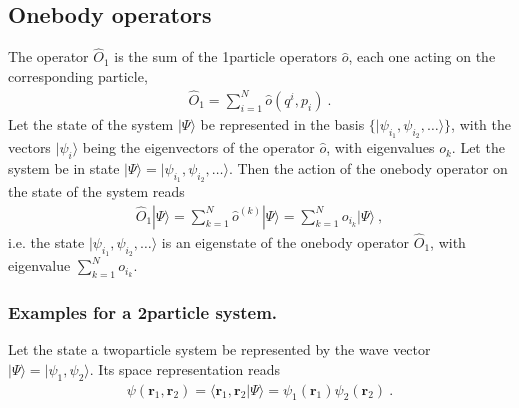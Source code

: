 \documentclass[letterpaper,10pt,english]{jupyterBook}
\begin{document}
\subsection{One\sphinxhyphen{}body operators}
\label{\detokenize{ch/quantum-mechanics/many-body/operators:one-body-operators}}\label{\detokenize{ch/quantum-mechanics/many-body/operators:quantum-mechanics-second-quantizazion-operators-one-body}}
\sphinxAtStartPar
{} The operator \(\hat{O}_1\) is the sum of the 1\sphinxhyphen{}particle operators \(\hat{o}\), each one acting on the corresponding particle,
\begin{equation}\label{equation:ch/quantum-mechanics/many-body/operators:eq:qft:operator:one-body:first-quantization}
\begin{split}\hat{O}_1 = \sum_{i=1}^{N} \hat{o}(q^i, p_i) \ .\end{split}
\end{equation}
\sphinxAtStartPar
Let the state of the system \(| \Psi \rangle\) be represented in the basis \(\{ | \psi_{i_1}, \psi_{i_2}, \dots \rangle \}\), with the vectors \(|\psi_i \rangle\) being the eigenvectors of the operator \(\hat{o}\), with eigenvalues \(o_k\). Let the system be in state \(| \Psi \rangle = | \psi_{i_1}, \psi_{i_2}, \dots \rangle\). Then the action of the one\sphinxhyphen{}body operator on the state of the system reads
\begin{equation}\label{equation:ch/quantum-mechanics/many-body/operators:eq:qft:operator:one-body:first-quantization:eig}
\begin{split}\hat{O}_1 | \Psi \rangle = \sum_{k=1}^{N} \hat{o}^{(k)} | \Psi \rangle = \sum_{k=1}^N o_{i_k} | \Psi \rangle \ ,\end{split}
\end{equation}
\sphinxAtStartPar
i.e. the state \(| \psi_{i_1}, \psi_{i_2}, \dots \rangle\) is an eigenstate of the one\sphinxhyphen{}body operator \(\hat{O}_1\), with eigenvalue \(\sum_{k=1}^{N} o_{i_k}\).
\subsubsection*{Examples for a 2\sphinxhyphen{}particle system.}

\sphinxAtStartPar
Let the state a two\sphinxhyphen{}particle system be represented by the wave vector \(| \Psi \rangle = | \psi_1, \psi_2 \rangle\). Its space representation reads
\begin{equation*}
\begin{split}\psi(\mathbf{r}_1, \mathbf{r}_2) = \langle \mathbf{r}_1, \mathbf{r}_2 | \Psi \rangle = \psi_1(\mathbf{r}_1) \psi_2(\mathbf{r}_2) \ .\end{split}
\end{equation*}
\sphinxAtStartPar
{} 
\end{document}
